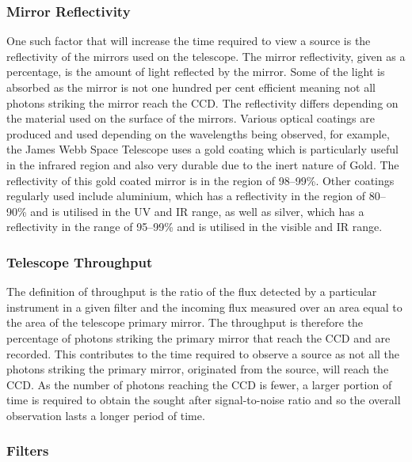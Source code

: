 		\subsubsection{Mirror Reflectivity} %
		\label{ssub:mirror_reflectivity}
			One such factor that will increase the time required to view a source is the reflectivity of the mirrors used on the telescope. The mirror reflectivity, given as a percentage, is the amount of light reflected by the mirror. Some of the light is absorbed as the mirror is not one hundred per cent efficient meaning not all photons striking the mirror reach the CCD. The reflectivity differs depending on the material used on the surface of the mirrors. Various optical coatings are produced and used depending on the wavelengths being observed, for example, the James Webb Space Telescope uses a gold coating which is particularly useful in the infrared region and also very durable due to the inert nature of Gold. The reflectivity of this gold coated mirror is in the region of 98--99\%\cite{Quantum_Coatings_Incorporated}. Other coatings regularly used include aluminium, which has a reflectivity in the region of 80--90\% and is utilised in the UV and IR range, as well as silver, which has a reflectivity in the range of 95--99\% and is utilised in the visible and IR range.

		\subsubsection{Telescope Throughput} %
		\label{ssub:telescope_throughput}
			The definition of throughput is the ratio of the flux detected by a particular instrument in a given filter and the incoming flux measured over an area equal to the area of the telescope primary mirror\cite{WIRCam_Throughput}. The throughput is therefore the percentage of photons striking the primary mirror that reach the CCD and are recorded. This contributes to the time required to observe a source as not all the photons striking the primary mirror, originated from the source, will reach the CCD. As the number of photons reaching the CCD is fewer, a larger portion of time is required to obtain the sought after signal-to-noise ratio and so the overall observation lasts a longer period of time.

		\subsubsection{Filters}

